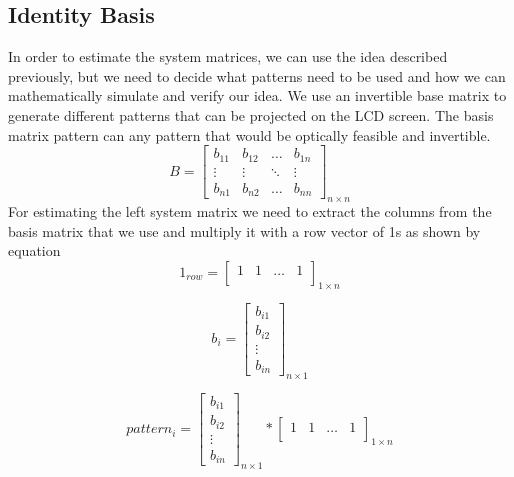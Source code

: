 \subsection{Identity Basis}
In order to estimate the system matrices, we can use the idea described previously, but we need to decide what patterns need to be used and how we can mathematically simulate and verify our idea. We use an invertible base matrix to generate different patterns that can be projected on the LCD screen. The basis matrix pattern can any pattern that would be optically feasible and invertible.
\begin{equation}
B = \begin{bmatrix} 
    b_{11} & b_{12} & \dots & b_{1n}\\
    \vdots & \vdots & \ddots &\vdots \\
    b_{n1} &  b_{n2} & \dots   & b_{nn} 
    \end{bmatrix}_{n\times n}
    \label{eq:basis_matr}
\end{equation}
For estimating the left system matrix we need to extract the columns from the basis matrix that we use and multiply it with a row vector of 1s as shown by equation \label{eq:pattern}
\begin{equation}
1_{row} = \begin{bmatrix} 
    1 & 1 & \dots &1\\

    \end{bmatrix}_{1\times n}
    \label{eq:one_row}
\end{equation}

\begin{equation}
b_{i} = \begin{bmatrix} 
    b_{i1} \\
    b_{i2} \\
    \vdots\\
    b_{in}
    \end{bmatrix}_{n\times 1}
    \label{eq:one_row}
\end{equation}


\begin{equation}
pattern_{i} = \begin{bmatrix} 
    b_{i1} \\
    b_{i2} \\
    \vdots\\
    b_{in}
    \end{bmatrix}_{n\times 1} *
    \begin{bmatrix} 
    1 & 1 & \dots &1\\

    \end{bmatrix}_{1\times n}
  \label{eq:pattern}
\end{equation}

